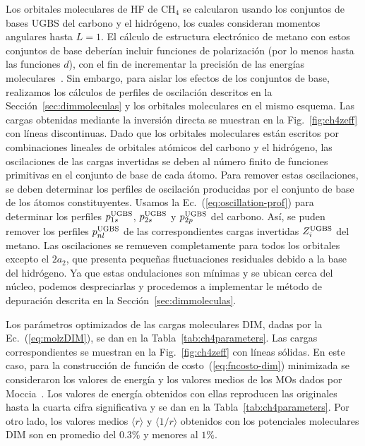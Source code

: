 Los orbitales moleculares de HF de CH$_4$ se calcularon usando los 
conjuntos de bases UGBS del carbono y el hidrógeno, los cuales 
consideran momentos angulares hasta $L=1$. El cálculo de estructura 
electrónico de metano con estos conjuntos de base deberían incluir 
funciones de polarización (por lo menos hasta las funciones $d$), con el 
fin de incrementar la precisión de las energías  
moleculares~\cite{Rothenberg:71,Hariharan:72}. Sin embargo, para aislar 
los efectos de los conjuntos de base, realizamos los cálculos de 
perfiles de oscilación descritos en la Sección~\ref{sec:dimmoleculas} y 
los orbitales moleculares en el mismo esquema. Las cargas obtenidas 
mediante la inversión directa se muestran en la Fig.~\ref{fig:ch4zeff} 
con líneas discontinuas. Dado que los orbitales moleculares están 
escritos por combinaciones lineales de orbitales atómicos del carbono y 
el hidrógeno, las oscilaciones de las cargas invertidas se deben al 
número finito de funciones primitivas en el conjunto de base de cada 
átomo. Para remover estas oscilaciones, se deben determinar los perfiles 
de oscilación producidas por el conjunto de base de los átomos 
constituyentes. Usamos la Ec.~(\ref{eq:oscillation-prof}) para 
determinar los perfiles $p_{1s}^{\mbox{\scriptsize UGBS}}$, 
$p_{2s}^{\mbox{\scriptsize UGBS}}$ y $p_{2p}^{\mbox{\scriptsize UGBS}}$ 
del carbono. Así, se puden remover los perfiles 
$p_{nl}^{\mbox{\scriptsize UGBS}}$ de las correspondientes cargas 
invertidas $Z_{i}^{\mbox{\scriptsize UGBS}}$ del metano. Las 
oscilaciones se remueven completamente para todos los orbitales excepto 
el $2a_2$, que presenta pequeñas fluctuaciones residuales debido a la 
base del hidrógeno. Ya que estas ondulaciones son mínimas y se ubican 
cerca del núcleo, podemos despreciarlas y procedemos a implementar le 
método de depuración descrita en la Sección~\ref{sec:dimmoleculas}. 

Los parámetros optimizados de las cargas moleculares DIM, dadas por la Ec.~(\ref{eq:molzDIM}), se dan en la Tabla~\ref{tab:ch4parameters}. Las cargas correspondientes se muestran en la Fig.~\ref{fig:ch4zeff} con líneas sólidas.  En este caso, para la construcción de función de costo~(\ref{eq:fncosto-dim}) minimizada se consideraron los valores de energía y los valores medios de los MOs dados por Moccia~\cite{Moccia:69}. Los valores de energía obtenidos con ellas reproducen las originales hasta la cuarta cifra significativa y se dan en la Tabla~\ref{tab:ch4parameters}. Por otro lado, los valores medios $\langle r\rangle$ y $\langle 1/r\rangle$ obtenidos con los potenciales moleculares DIM son en promedio del $0.3\%$ y menores al $1\%$.


